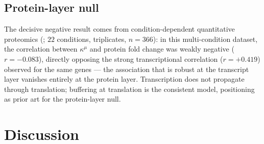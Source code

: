 \documentclass[11pt,a4paper]{article}
\theoremstyle{plain}
\theoremstyle{definition}
\theoremstyle{remark}
\newcommand{\kmu}{\kappa^{\mu}}
\begin{document}
\subsection{Protein-layer null}
\label{sec:e27}
The decisive negative result comes from condition-dependent
quantitative proteomics (\citet{schmidt2016}; $22$ conditions,
triplicates, $n = 366$): in this multi-condition dataset, the
correlation between $\kmu$ and protein fold change was weakly
negative ($r = -0.083$), directly opposing the strong transcriptional
correlation ($r = +0.419$) observed for the same genes --- the
association that is robust at the transcript layer vanishes entirely
at the protein layer. Transcription does not propagate through
translation; buffering at translation is the consistent model,
positioning \citet{kochanowski2013} as prior art for the
protein-layer null.

\section{Discussion}
\label{sec:discussion}
\end{document}
